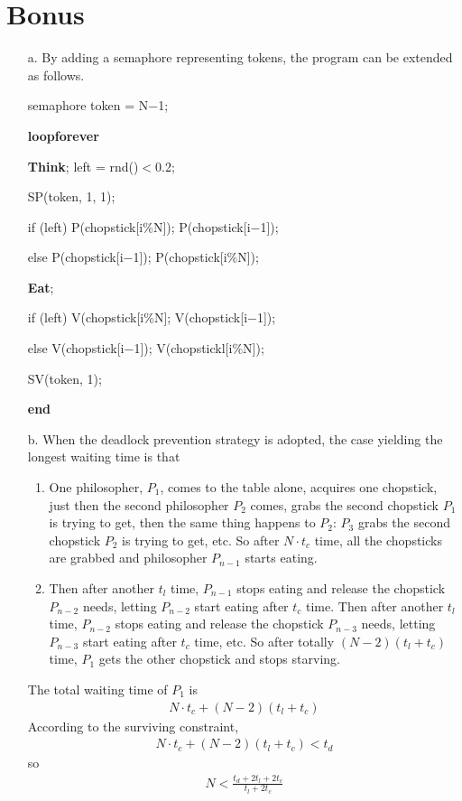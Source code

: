 \documentclass[12pt,letterpaper]{article}
\begin{document}
\section*{Bonus}
\begin{itemize}
\item[a.] By adding a semaphore representing tokens, the program can be extended as follows.

semaphore token = N$-$1;

\textbf{loopforever}

\hspace{3em}\textbf{Think}; left = rnd()$<$0.2;

\hspace{3em}SP(token, 1, 1);

\hspace{3em}if (left) P(chopstick[i\%N]); P(chopstick[i$-$1]);

\hspace{3em}else P(chopstick[i$-$1]); P(chopstick[i\%N]);

\hspace{3em}\textbf{Eat};

\hspace{3em}if (left) V(chopstick[i\%N]; V(chopstick[i$-$1]);

\hspace{3em}else V(chopstick[i$-$1]); V(chopstickl[i\%N]);

\hspace{3em}SV(token, 1);

\textbf{end}

\item[b.] When the deadlock prevention strategy is adopted, the case yielding the longest waiting time is that
\begin{enumerate}
\item One philosopher, $P_1$, comes to the table alone, acquires one chopstick, just then the second philosopher $P_2$ comes, grabs the second chopstick $P_1$ is trying to get, then the same thing happens to $P_2$: $P_3$ grabs the second chopstick $P_2$ is trying to get, etc. So after $N\cdot t_c$ time, all the chopsticks are grabbed and philosopher $P_{n-1}$ starts eating. 
\item Then after another $t_l$ time, $P_{n-1}$ stops eating and release the chopstick $P_{n-2}$ needs, letting $P_{n-2}$ start eating after $t_c$ time. Then after another $t_l$ time, $P_{n-2}$ stops eating and release the chopstick $P_{n-3}$ needs, letting $P_{n-3}$ start eating after $t_c$ time, etc. So after totally $(N-2)(t_l+t_c)$ time, $P_1$ gets the other chopstick and stops starving.
\end{enumerate}
The total waiting time of $P_1$ is
\begin{align}
N\cdot t_c+(N-2)(t_l+t_c)
\end{align}
According to the surviving constraint,
\begin{align}
N\cdot t_c+(N-2)(t_l+t_c)<t_d
\end{align}
so 
\begin{align}
N < \frac{t_d+2t_l+2t_c}{t_l+2t_c}
\end{align}
\end{itemize}
\end{document}
